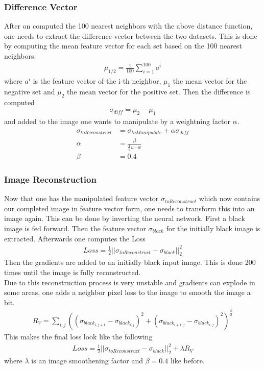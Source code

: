 \documentclass[
     11pt,         %
     a4paper,      %
     oneside,
     ]{article}
\begin{document}
\subsubsection{Difference Vector}
After on computed the 100 nearest neighbors with the above distance function, one needs to extract the difference vector between the two datasets.
This is done by computing the mean feature vector for each set based on the 100 nearest neighbors.
\begin{align*}
  \mu_{1/2} = \frac{1}{100} \sum^{100}_{i=1} a^i
\end{align*}
where $a^i$ is the feature vector of the i-th neighbor, $\mu_1$ the mean vector for the negative set and $\mu_2$ the mean vector for the positive set.
Then the difference is computed
\begin{align*}
  \sigma_{diff} = \mu_2 - \mu_1
\end{align*}
and added to the image one wants to manipulate by a weightning factor $\alpha$.
\begin{align*}
  \sigma_{toReconstruct} &= \sigma_{toManipulate} + \alpha \sigma_{diff}\\
  \alpha &= \frac{\beta}{\frac{1}{d} w \cdot w}\\
  \beta &= 0.4
\end{align*}
\subsubsection{Image Reconstruction}
Now that one has the manipulated feature vector $\sigma_{toReconstruct}$ which now contains our completed image in feature vector form, one needs to transform this into an image again. This can be done by inverting the neural network. First a black image is fed forward. Then the feature vector $\sigma_{black}$ for the initially black image is extracted. Afterwards one computes the Loss
\begin{align*}
  Loss = \frac{1}{2} ||\sigma_{toReconstruct} - \sigma_{black}||_2^2
\end{align*}
Then the gradients are added to an initially black input image. This is done 200 times until the image is fully reconstructed. \\
Due to this reconstruction process is very unstable and gradients can explode in some areas, one adds a neighbor pixel loss to the image to smooth the image a bit.
\begin{align*}
  R_V = \sum_{i,j} ((\sigma_{black_{i,j+1}} - \sigma_{black_{i,j}})^2 + (\sigma_{black_{i+1,j}} - \sigma_{black_{i,j}})^2)^{\frac{\beta}{2}}
\end{align*}
This makes the final loss look like the following
\begin{align*}
  Loss = \frac{1}{2} ||\sigma_{toReconstruct} - \sigma_{black}||_2^2 + \lambda R_V
\end{align*}
where $\lambda$ is an image smoothening factor and $\beta = 0.4$ like before.
\end{document}
